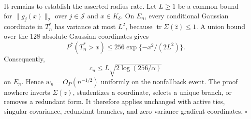 It remains to establish the asserted radius rate.  Let \(L\geq1\) be a common bound for \(\|g_j(x)\|_2\) over \(j\in\mathcal J\) and \(x\in K_\delta\).  On \(E_n\), every conditional Gaussian coordinate in \(T_n^*\) has variance at most \(L^2\), because \(\operatorname{tr}\Sigma(\widehat z)\leq1\).  A union bound over the \(128\) absolute Gaussian coordinates gives
\[
 P^*(T_n^*>x)\leq256\exp\{-x^2/(2L^2)\}.
\]
Consequently,
\[
 c_n\leq L\sqrt{2\log(256/\alpha)}
\]
on \(E_n\).  Hence \(w_n=O_P(n^{-1/2})\) uniformly on the nonfallback event.  The proof nowhere inverts \(\Sigma(z)\), studentizes a coordinate, selects a unique branch, or removes a redundant form.  It therefore applies unchanged with active ties, singular covariance, redundant branches, and zero-variance gradient coordinates. \(\square\)

